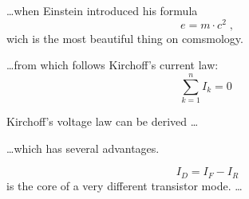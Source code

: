 \documentclass[a4paper,11pt]{article}
\begin{document}
\ldots when Einstein introduced his formula
\begin{equation}
  e = m \cdot c^2 \; ,
\end{equation}
wich is the most beautiful thing on comsmology.

\ldots from which follows Kirchoff's current law:
\begin{equation}
  \sum_{k=1}^{n} I_k = 0 \;
\end{equation}

Kirchoff's voltage law can be derived \ldots

\ldots which has several advantages.

\begin{equation}
  I_D = I_F - I_R
\end{equation}
is the core of a very different transistor mode. \ldots
\end{document}
